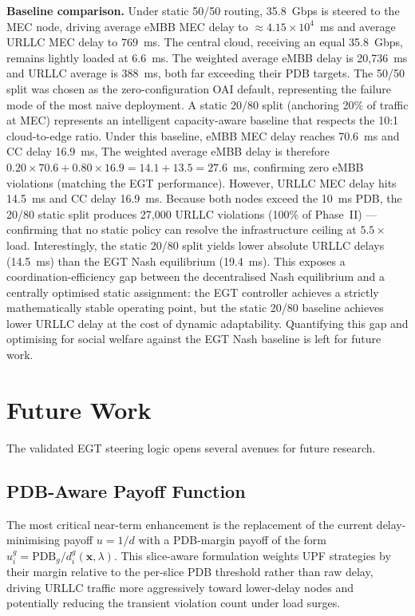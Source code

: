 \documentclass[conference]{IEEEtran}
\begin{document}
\textbf{Baseline comparison.}
Under static 50/50 routing, 35.8~Gbps is steered to the MEC
node, driving average eMBB MEC delay to
$\approx 4.15\times10^4$~ms and average URLLC MEC delay to
$769$~ms. The central cloud, receiving an equal 35.8~Gbps,
remains lightly loaded at 6.6~ms. The weighted average eMBB
delay is 20,736~ms and URLLC average is 388~ms, both far
exceeding their PDB targets. The 50/50 split was chosen as the
zero-configuration OAI default, representing the failure mode
of the most naive deployment. A static 20/80 split (anchoring
20\% of traffic at MEC) represents an intelligent capacity-aware
baseline that respects the 10:1 cloud-to-edge ratio. Under this
baseline, eMBB MEC delay reaches 70.6~ms and CC delay 16.9~ms,
The weighted average eMBB delay is therefore
$0.20 \times 70.6 + 0.80 \times 16.9 = 14.1 + 13.5 = 27.6$~ms,
confirming zero eMBB violations (matching the EGT performance).
However, URLLC MEC delay hits
14.5~ms and CC delay 16.9~ms. Because both nodes exceed the
10~ms PDB, the 20/80 static split produces 27,000 URLLC violations
(100\% of Phase~II) --- confirming that no static policy can resolve
the infrastructure ceiling at $5.5\times$ load. Interestingly, the
static 20/80 split yields lower absolute URLLC delays (14.5~ms)
than the EGT Nash equilibrium (19.4~ms). This exposes a
coordination-efficiency gap between the decentralised Nash
equilibrium and a centrally optimised static assignment: the EGT
controller achieves a strictly mathematically stable operating
point, but the static 20/80 baseline achieves lower URLLC delay
at the cost of dynamic adaptability.
Quantifying this gap and optimising for social welfare against the
EGT Nash baseline is left for future work.

\section{Future Work}
\label{sec:future}

The validated EGT steering logic opens several avenues
for future research.

\subsection{PDB-Aware Payoff Function}

The most critical near-term enhancement is the replacement
of the current delay-minimising payoff $u = 1/d$ with a
PDB-margin payoff of the form
$u_i^g = \text{PDB}_g / d_i^g(\mathbf{x},\lambda)$.
This slice-aware formulation weights UPF strategies by their
margin relative to the per-slice PDB threshold rather than raw
delay, driving URLLC traffic more aggressively toward
lower-delay nodes and potentially reducing the transient
violation count under load surges.
\end{document}
